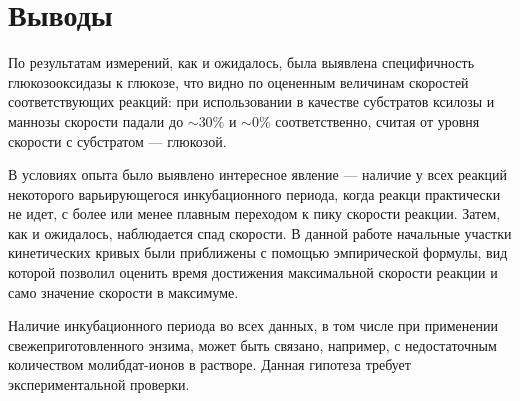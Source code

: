 \documentclass[a4paper]{article}
\begin{document}
\section{\LARGE Выводы}
\par \hspace{0.33 cm}

По результатам измерений, как и ожидалось, была выявлена специфичность глюкозооксидазы к глюкозе, что видно по оцененным величинам скоростей соответствующих реакций: при использовании в качестве субстратов ксилозы и маннозы скорости падали до $\sim$30\% и $\sim$0\% соответственно, считая от уровня скорости с субстратом --- глюкозой. \par \vspace{0.2 cm}
В условиях опыта было выявлено интересное явление --- наличие у всех реакций некоторого варьирующегося инкубационного периода, когда реакци практически не идет, с более или менее плавным переходом к пику скорости реакции. Затем, как и ожидалось, наблюдается спад скорости. В данной работе начальные участки кинетических кривых были приближены с помощью эмпирической формулы, вид которой позволил оценить время достижения максимальной скорости реакции и само значение скорости в максимуме. \par \vspace{0.2 cm}
Наличие инкубационного периода во всех данных, в том числе при применении свежеприготовленного энзима, может быть связано, например, с недостаточным количеством молибдат-ионов в растворе. Данная гипотеза требует экспериментальной проверки.
\end{document}
